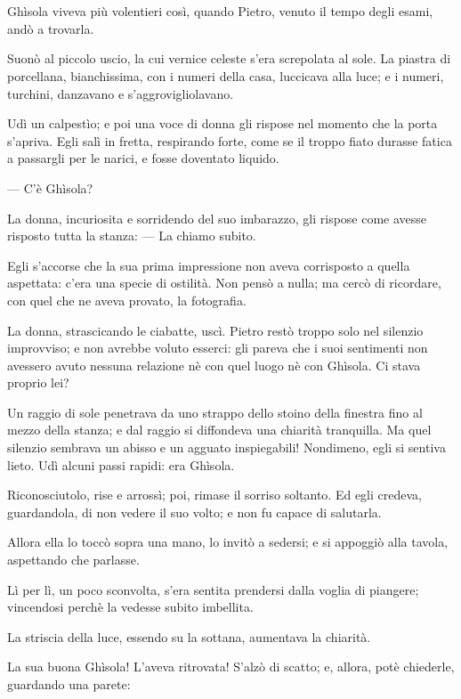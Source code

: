 \chapter{}

Ghìsola viveva più volentieri così, quando Pietro, venuto il tempo degli esami, andò a trovarla.

Suonò al piccolo uscio, la cui vernice celeste s'era screpolata al sole. La piastra di porcellana, bianchissima, con i numeri della casa, luccicava alla luce; e i numeri, turchini, danzavano e s’aggrovigliolavano.

Udì un calpestìo; e poi una voce di donna gli rispose nel momento che la porta s’apriva. Egli salì in fretta, respirando forte, come se il troppo fiato durasse fatica a passargli per le narici, e fosse doventato liquido.

— C’è Ghìsola?

La donna, incuriosita e sorridendo del suo imbarazzo, gli rispose come avesse risposto tutta la stanza: — La chiamo subito.

Egli s’accorse che la sua prima impressione non aveva corrisposto a quella aspettata: c’era una specie di ostilità. Non pensò a nulla; ma cercò di ricordare, con quel che ne aveva provato, la fotografia.

La donna, strascicando le ciabatte, uscì. Pietro restò troppo solo nel silenzio improvviso; e non avrebbe voluto esserci: gli pareva che i suoi sentimenti non avessero avuto nessuna relazione nè con quel luogo nè con Ghìsola. Ci stava proprio lei?

Un raggio di sole penetrava da uno strappo dello stoino della finestra fino al mezzo della stanza; e dal raggio si diffondeva una chiarità tranquilla. Ma quel silenzio sembrava un abisso e un agguato inspiegabili! Nondimeno, egli si sentiva lieto. Udì alcuni passi rapidi: era Ghìsola.

Riconosciutolo, rise e arrossì; poi, rimase il sorriso soltanto. Ed egli credeva, guardandola, di non vedere il suo volto; e non fu capace di salutarla.

Allora ella lo toccò sopra una mano, lo invitò a sedersi; e si appoggiò alla tavola, aspettando che parlasse.

Lì per lì, un poco sconvolta, s’era sentita prendersi dalla voglia di piangere; vincendosi perchè la vedesse subito imbellita.

La striscia della luce, essendo su la sottana, aumentava la chiarità.

La sua buona Ghìsola! L’aveva ritrovata! S’alzò di scatto; e, allora, potè chiederle, guardando una parete:

